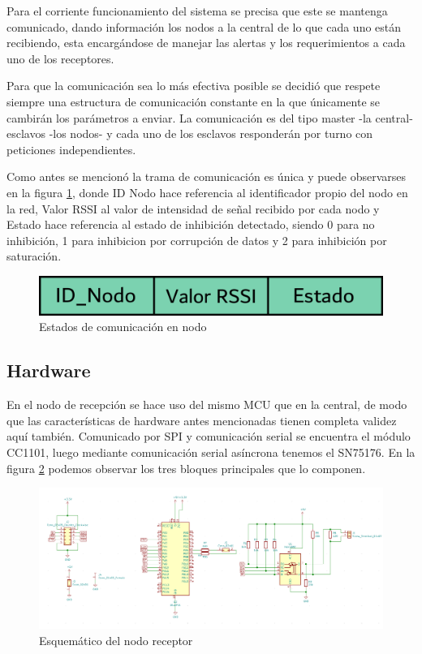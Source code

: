 Para el corriente funcionamiento del sistema se precisa que este se mantenga comunicado, dando información los nodos a la 
central de lo que cada uno están recibiendo, esta encargándose de manejar las alertas y los requerimientos a cada uno de los 
receptores. \par 
Para que la comunicación sea lo más efectiva posible se decidió que respete siempre una estructura de comunicación constante
en la que únicamente se cambirán los parámetros a enviar. La comunicación es del tipo master -la central- esclavos -los nodos-
y cada uno de los esclavos responderán por turno con peticiones independientes. \par
Como antes se mencionó la trama de comunicación es única y puede observarses en la figura \ref{comunicacion_nodo}, donde 
ID Nodo hace referencia al identificador propio del nodo en la red, Valor RSSI al valor de intensidad de señal recibido por cada
nodo y Estado hace referencia al estado de inhibición detectado, siendo 0 para no inhibición, 1 para inhibicion por corrupción
de datos y 2 para inhibición por saturación.

\begin{figure}
	\centering
	\includegraphics[scale=0.43]{images/nodos/comunicacion_nodo.png}
    \caption{Estados de comunicación en nodo}
	\label{comunicacion_nodo}
\end{figure}


\subsection{Hardware}

En el nodo de recepción se hace uso del mismo MCU que en la central, de modo que las características de hardware antes mencionadas
tienen completa validez aquí también. Comunicado por SPI y comunicación serial se encuentra el módulo CC1101, luego mediante
comunicación serial asíncrona tenemos el SN75176. En la figura \ref{schema_nodo} podemos observar los tres bloques principales
que lo componen. \par 


\begin{figure}
	\centering
	\includegraphics[scale=0.3]{images/nodos/schema_nodo.png}
    \caption{Esquemático del nodo receptor}
	\label{schema_nodo}
\end{figure}

